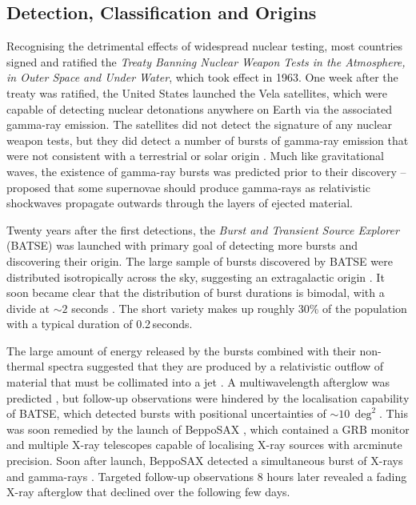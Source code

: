 \subsection{Detection, Classification and Origins}
Recognising the detrimental effects of widespread nuclear testing, most countries signed and ratified the \textit{Treaty Banning Nuclear Weapon Tests in the Atmosphere, in Outer Space and Under Water}, which took effect in 1963. One week after the treaty was ratified, the United States launched the Vela satellites, which were capable of detecting nuclear detonations anywhere on Earth via the associated gamma-ray emission. The satellites did not detect the signature of any nuclear weapon tests, but they did detect a number of bursts of gamma-ray emission that were not consistent with a terrestrial or solar origin \citep{1973ApJ...182L..85K}. Much like gravitational waves, the existence of gamma-ray bursts was predicted prior to their discovery -- \citet{1968CaJPh..46..476C} proposed that some supernovae should produce gamma-rays as relativistic shockwaves propagate outwards through the layers of ejected material.

Twenty years after the first detections, the \textit{Burst and Transient Source Explorer} (BATSE) was launched with primary goal of detecting more bursts and discovering their origin. The large sample of bursts discovered by BATSE were distributed isotropically across the sky, suggesting an extragalactic origin \citep{1992Natur.355..143M}. It soon became clear that the distribution of burst durations is bimodal, with a divide at $\sim 2$ seconds \citep{1993ApJ...413L.101K}. The short variety makes up roughly 30\% of the population with a typical duration of 0.2\,seconds.

The large amount of energy released by the bursts combined with their non-thermal spectra suggested that they are produced by a relativistic outflow of material \citep{1975NYASA.262..164R,1986ApJ...308L..43P} that must be collimated into a jet \citep{1993NYASA.688..321P,1999ApJ...526..707P,1999ApJ...525..737R,1999ApJ...519L..17S}. A multiwavelength afterglow was predicted \citep{1993ApJ...418L...5P}, but follow-up observations were hindered by the localisation capability of BATSE, which detected bursts with positional uncertainties of $\sim 10\,\deg^2$. This was soon remedied by the launch of BeppoSAX \citep{1997A&AS..122..299B}, which contained a GRB monitor and multiple X-ray telescopes capable of localising X-ray sources with arcminute precision. Soon after launch, BeppoSAX detected a simultaneous burst of X-rays and gamma-rays \citep{1997Natur.387..783C}. Targeted follow-up observations 8 hours later revealed a fading X-ray afterglow that declined over the following few days.

